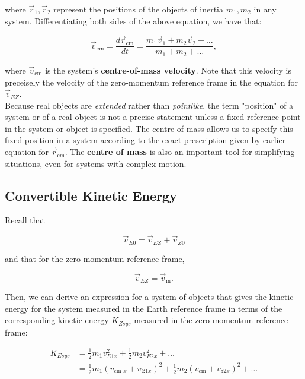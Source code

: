         where $\vec{r}_1,\vec{r}_2$ represent the positions of the objects of inertia $m_1, m_2$ in any system. Differentiating both sides of the above equation, we have that:

        \[
            \vec{v}_{\text{cm}} = \frac{d\vec{r}_{\text{cm}}}{dt}=\frac{m_1 \vec{v}_1 + m_2 \vec{v}_2 + \dots}{m_1 + m_2 + \dots},
        \]

        where $\vec{v}_\text{cm}$ is the system's \textbf{centre-of-mass velocity}. Note that this velocity is preceisely the velocity of the zero-momentum reference frame in the equation for $\vec{v}_{EZ}$. \\


        Because real objects are \textit{extended} rather than \textit{pointlike}, the term "position" of a system or of a real object is not a precise statement unless a fixed reference point in the system or object
        is specified. The centre of mass allows us to specify this fixed position in a system according to the exact prescription given by earlier equation for $\vec{r}_{\text{cm}}$. The \textbf{centre of mass} is also
        an important tool for simplifying situations, even for systems with complex motion.




    \subsection{Convertible Kinetic Energy}

        Recall that

        \[
            \vec{v}_{E0} = \vec{v}_{EZ}+\vec{v}_{Z0}
        \]

        and that for the zero-momentum reference frame,

        \[
            \vec{v}_{EZ} = \vec{v}_{\text{m}}.
        \]

        Then, we can derive an expression for a system of objects that gives the kinetic energy for the system measured in the Earth reference frame in terms of the corresponding kinetic energy $K_{Zsys}$ measured
        in the zero-momentum reference frame:

        \begin{align*}
            K_{Esys}    &= \frac{1}{2}m_1 v^2_{E1x} + \frac{1}{2}m_2 v^2_{E2x} + \dots \\
                        &= \frac{1}{2}m_1 (v_{\text{cm }x}+v_{Z1x})^2 + \frac{1}{2}m_2 (v_{\text{cm}}+v_{z2x})^2 + \dots
        \end{align*}


